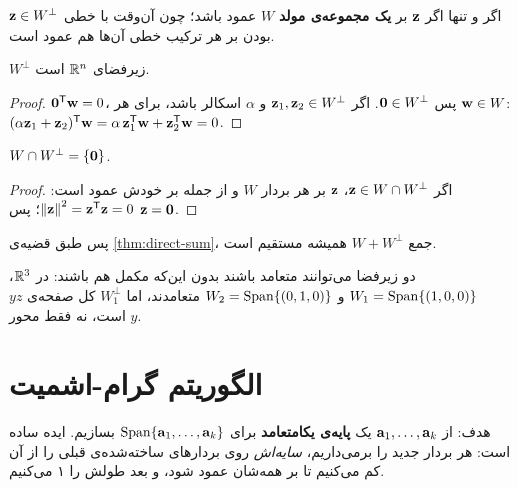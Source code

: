 \begin{note}
$\mathbf{z}\in W^\perp$ اگر و تنها اگر $\mathbf{z}$ بر \textbf{یک مجموعه‌ی مولد} $W$ عمود باشد؛ چون آن‌وقت با خطی بودن بر هر ترکیب خطی آن‌ها هم عمود است.
\end{note}

\begin{theorem}\label{thm:perp-subspace}
$W^\perp$ زیرفضای $\mathbb{R}^n$ است.
\end{theorem}
\begin{proof}
$\mathbf{0}^{\mathsf{T}}\mathbf{w}=0$، پس $\mathbf{0}\in W^\perp$. اگر $\mathbf{z}_1,\mathbf{z}_2\in W^\perp$ و $\alpha$ اسکالر باشد، برای هر $\mathbf{w}\in W$:
$(\alpha\mathbf{z}_1+\mathbf{z}_2)^{\mathsf{T}}\mathbf{w}=\alpha\,\mathbf{z}_1^{\mathsf{T}}\mathbf{w}+\mathbf{z}_2^{\mathsf{T}}\mathbf{w}=0$.
\end{proof}

\begin{theorem}\label{thm:perp-cap}
$W\cap W^\perp=\{\mathbf{0}\}$.
\end{theorem}
\begin{proof}
اگر $\mathbf{z}\in W\cap W^\perp$، $\mathbf{z}$ بر هر بردار $W$ و از جمله بر خودش عمود است: $\left\lVert \mathbf{z}\right\rVert^2=\mathbf{z}^{\mathsf{T}}\mathbf{z}=0$؛ پس $\mathbf{z}=\mathbf{0}$.
\end{proof}

پس طبق قضیه‌ی \ref{thm:direct-sum}، جمع $W+W^\perp$ همیشه مستقیم است.

\begin{warning}
دو زیرفضا می‌توانند متعامد باشند بدون این‌که مکمل هم باشند: در $\mathbb{R}^3$، $W_1=\operatorname{Span}\{(1,0,0)\}$ و $W_2=\operatorname{Span}\{(0,1,0)\}$ متعامدند، اما $W_1^\perp$ کل صفحه‌ی $yz$ است، نه فقط محور $y$.
\end{warning}

\section{الگوریتم گرام-اشمیت}

هدف: از $\mathbf{a}_1,\dots,\mathbf{a}_k$ یک \textbf{پایه‌ی یکامتعامد} برای $\operatorname{Span}\{\mathbf{a}_1,\dots,\mathbf{a}_k\}$ بسازیم. ایده ساده است: هر بردار جدید را برمی‌داریم، \emph{سایه‌اش} روی بردارهای ساخته‌شده‌ی قبلی را از آن کم می‌کنیم تا بر همه‌شان عمود شود، و بعد طولش را ۱ می‌کنیم.

